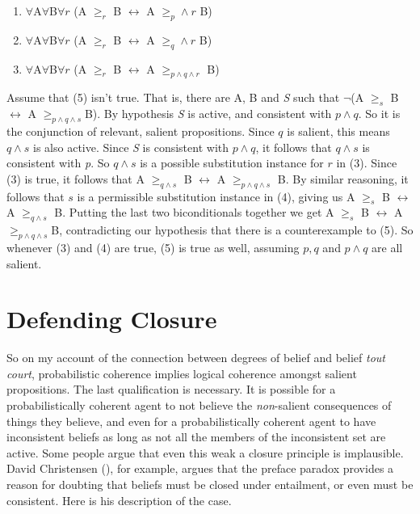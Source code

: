 \documentclass[
  11pt,
  letterpaper,
  DIV=11,
  numbers=noendperiod,
  oneside]{scrartcl}
\begin{document}
\begin{enumerate}
\def\labelenumi{\arabic{enumi}.}
\item
  \(\forall\)A\(\forall\)B\(\forall r\) (A \(\geq_r\) B
  \(\leftrightarrow\) A \(\geq _p \wedge r\) B)
\item
  \(\forall\)A\(\forall\)B\(\forall r\) (A \(\geq_r\) B
  \(\leftrightarrow\) A \(\geq _q \wedge r\) B)
\item
  \(\forall\)A\(\forall\)B\(\forall r\) (A \(\geq_r\) B
  \(\leftrightarrow\) A \(\geq _{p \wedge q \wedge r}\) B)
\end{enumerate}

Assume that (5) isn't true. That is, there are A, B and \emph{S} such
that \(\neg\)(A \(\geq_s\) B \(\leftrightarrow\) A
\(\geq _{p \wedge q \wedge s}\)B). By hypothesis \emph{S} is active, and
consistent with \(p \wedge q\). So it is the conjunction of relevant,
salient propositions. Since \(q\) is salient, this means \(q \wedge s\)
is also active. Since \emph{S} is consistent with \(p \wedge q\), it
follows that \(q \wedge s\) is consistent with \emph{p}. So
\(q \wedge s\) is a possible substitution instance for \(r\) in (3).
Since (3) is true, it follows that A \(\geq _{q \wedge s}\) B
\(\leftrightarrow\) A \(\geq _{p \wedge q \wedge s}\) B. By similar
reasoning, it follows that \(s\) is a permissible substitution instance
in (4), giving us A \(\geq_s\) B \(\leftrightarrow\) A
\(\geq _{q \wedge s}\) B. Putting the last two biconditionals together
we get A \(\geq_s\) B \(\leftrightarrow\) A
\(\geq _{p \wedge q \wedge s}\)B, contradicting our hypothesis that
there is a counterexample to (5). So whenever (3) and (4) are true, (5)
is true as well, assuming \(p, q\) and \(p \wedge q\) are all salient.

\section{Defending Closure}\label{defending-closure}

So on my account of the connection between degrees of belief and belief
\emph{tout court}, probabilistic coherence implies logical coherence
amongst salient propositions. The last qualification is necessary. It is
possible for a probabilistically coherent agent to not believe the
\emph{non}-salient consequences of things they believe, and even for a
probabilistically coherent agent to have inconsistent beliefs as long as
not all the members of the inconsistent set are active. Some people
argue that even this weak a closure principle is implausible. David
Christensen (), for example, argues
that the preface paradox provides a reason for doubting that beliefs
must be closed under entailment, or even must be consistent. Here is his
description of the case.
\end{document}
